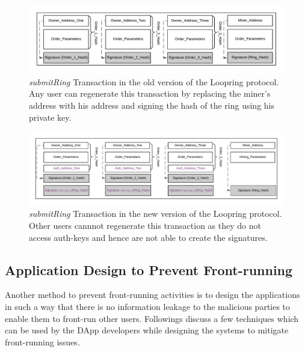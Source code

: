 \begin{figure}[h]
\centering
\includegraphics[width=0.7\linewidth]{figures/Vulnerable_Loopring.png}
\caption{\emph{submitRing} Transaction in the old version of the Loopring protocol. Any user can regenerate this transaction by replacing the miner's address with his address and signing the hash of the ring using his private key. \label{fig:vulnerable_loopring}}
\end{figure}
\begin{figure}[h]
\centering
\includegraphics[width=0.7\linewidth]{figures/Dual_Authoring_Loopring.png}
\caption{\emph{submitRing} Transaction in the new version of the Loopring protocol. Other users cannnot regenerate this transaction as they do not access auth-keys and hence are not able to create the signatures. \label{fig:not_vulnerable_loopring}}
\end{figure}
\subsection{Application Design to Prevent Front-running}

Another method to prevent front-running activities is to design the applications in such a way that there is no information leakage to the malicious parties to enable them to front-run other users.
Followings discuss a few techniques which can be used by the DApp developers while designing the systems to mitigate front-running issues.

